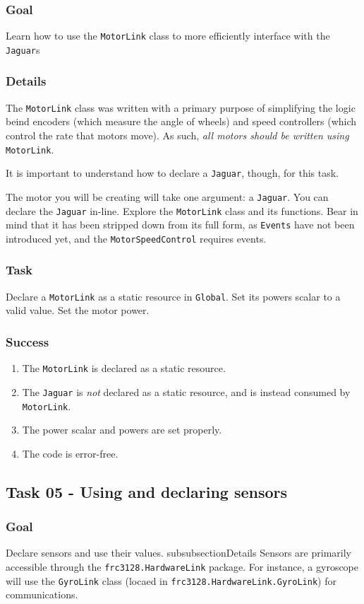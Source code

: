 \documentclass[a4paper]{article}
\begin{document}
\subsubsection{Goal} Learn how to use the \lstinline{MotorLink} class to more efficiently interface with the \lstinline{Jaguar}s
\subsubsection{Details} The \lstinline{MotorLink} class was written with a primary purpose of simplifying the logic beind encoders (which measure the angle of wheels) and speed controllers (which control the rate that motors move). As such, \textit{all motors should be written using} \lstinline{MotorLink}. 

It is important to understand how to declare a \lstinline{Jaguar}, though, for this task.

The motor you will be creating will take one argument: a \lstinline{Jaguar}. You can declare the \lstinline{Jaguar} in-line. Explore the \lstinline{MotorLink} class and its functions. Bear in mind that it has been stripped down from its full form, as \lstinline{Events} have not been introduced yet, and the \lstinline{MotorSpeedControl} requires events.
\subsubsection{Task} Declare a \lstinline{MotorLink} as a static resource in \lstinline{Global}. Set its powers scalar to a valid value. Set the motor power.
\subsubsection{Success} \begin{enumerate}\item{The \lstinline{MotorLink} is declared as a static resource.}\item{The \lstinline{Jaguar} is \textit{not} declared as a static resource, and is instead consumed by \lstinline{MotorLink}.}\item{The power scalar and powers are set properly.}\item{The code is error-free.}\end{enumerate}

\subsection{Task 05 - Using and declaring sensors}
\subsubsection{Goal} Declare sensors and use their values.
subsubsection{Details} Sensors are primarily accessible through the \lstinline{frc3128.HardwareLink} package. For instance, a gyroscope will use the \lstinline{GyroLink} class (locaed in \lstinline{frc3128.HardwareLink.GyroLink}) for communications. 
\end{document}

